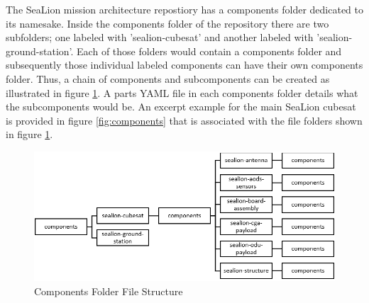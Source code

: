\documentclass[journal,article,submit,pdftex,moreauthors]{Definitions/mdpi}
\begin{document}
  The SeaLion mission architecture repostiory has a components folder dedicated to its namesake.  Inside the components folder of the repository there are two subfolders; one labeled with 'sealion-cubesat' and another labeled with 'sealion-ground-station'.  Each of those folders would contain a components folder and subsequently those individual labeled components can have their own components folder.  Thus, a chain of components and subcomponents can be created as illustrated in figure \ref{fig:components_file}.  A parts YAML file in each components folder details what the subcomponents would be.  An excerpt example for the main SeaLion cubesat is provided in figure \ref{fig:components} that is associated with the file folders shown in figure \ref{fig:components_file}.

\begin{figure}[H]
    \includegraphics[width=10.5 cm]{assets/components_file.png}
    \caption{Components Folder File Structure}
	\label{fig:components_file}
    \end{figure}   
\unskip
\end{document}
